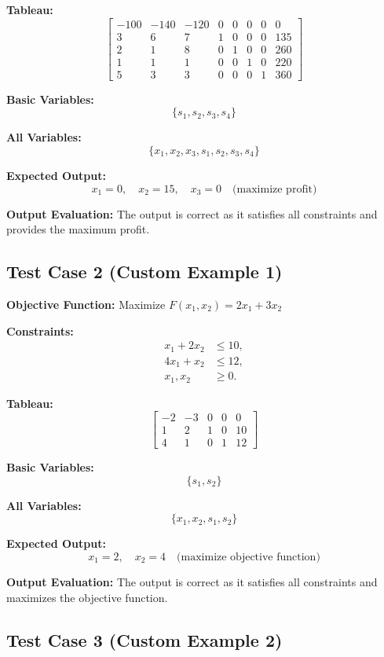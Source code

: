\documentclass{article}
\begin{document}
\textbf{Tableau:}
\[
\begin{bmatrix}
-100 & -140 & -120 & 0 & 0 & 0 & 0 & 0 \\
3 & 6 & 7 & 1 & 0 & 0 & 0 & 135 \\
2 & 1 & 8 & 0 & 1 & 0 & 0 & 260 \\
1 & 1 & 1 & 0 & 0 & 1 & 0 & 220 \\
5 & 3 & 3 & 0 & 0 & 0 & 1 & 360
\end{bmatrix}
\]

\textbf{Basic Variables:}
\[
\{ s_1, s_2, s_3, s_4 \}
\]

\textbf{All Variables:}
\[
\{ x_1, x_2, x_3, s_1, s_2, s_3, s_4 \}
\]

\textbf{Expected Output:}
\[
x_1 = 0, \quad x_2 = 15, \quad x_3 = 0 \quad \text{(maximize profit)}
\]

\textbf{Output Evaluation:} The output is correct as it satisfies all constraints and provides the maximum profit.

\subsection*{Test Case 2 (Custom Example 1)}

\textbf{Objective Function:} Maximize \( F(x_1, x_2) = 2x_1 + 3x_2 \)

\textbf{Constraints:}
\[
\begin{aligned}
x_1 + 2x_2 &\leq 10, \\
4x_1 + x_2 &\leq 12, \\
x_1, x_2 &\geq 0.
\end{aligned}
\]

\textbf{Tableau:}
\[
\begin{bmatrix}
-2 & -3 & 0 & 0 & 0 \\
1 & 2 & 1 & 0 & 10 \\
4 & 1 & 0 & 1 & 12
\end{bmatrix}
\]

\textbf{Basic Variables:}
\[
\{ s_1, s_2 \}
\]

\textbf{All Variables:}
\[
\{ x_1, x_2, s_1, s_2 \}
\]

\textbf{Expected Output:}
\[
x_1 = 2, \quad x_2 = 4 \quad \text{(maximize objective function)}
\]

\textbf{Output Evaluation:} The output is correct as it satisfies all constraints and maximizes the objective function.

\subsection*{Test Case 3 (Custom Example 2)}
\end{document}
